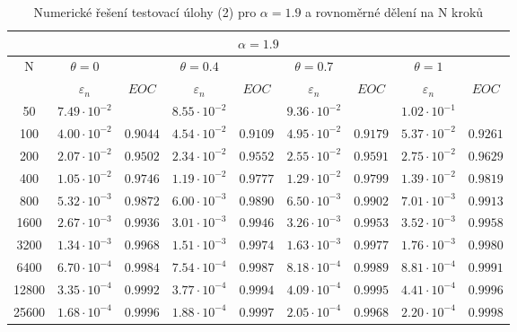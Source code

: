 \documentclass[a4paper,12pt,twoside]{article}
\theoremstyle{definition}
\theoremstyle{remark}
\numberwithin{equation}{section}
\numberwithin{table}{section}
\numberwithin{figure}{section}
\begin{document}
	\begin{table}[h!]
		\centering
		\caption{Numerické řešení testovací úlohy (2) pro $\alpha = 1.9$ a rovnoměrné dělení na N kroků}
		\label{tab:tabulkaTestovacíÚloha(2),alpha=1.9}
	\begin{tabular}{|c||cc|cc|cc|cc|}
		\hline
		\multicolumn{9}{|c|}{$\alpha = 1.9$} \\
		\hline
		N 	  & $\theta = 0$ & & $\theta = 0.4$ && $\theta = 0.7$ & &$\theta = 1$& \\
		\hline
		& $\varepsilon_{n}$    & $EOC$    & $\varepsilon_{n}$    &$EOC$   & $\varepsilon_{n}$    &$EOC$    &$\varepsilon_{n}$    &$EOC$ \\
		50 	  & $7.49 \cdot 10^{-2}$ & 		    & $8.55 \cdot 10^{-2}$ &		& $9.36 \cdot 10^{-2}$ & 	     &$1.02 \cdot 10^{-1}$& \\
		\hline
		100   & $4.00 \cdot 10^{-2}$ & $0.9044$ & $4.54 \cdot 10^{-2}$ &$0.9109$& $4.95 \cdot 10^{-2}$ &$0.9179$ &$5.37 \cdot 10^{-2}$&$0.9261$ \\
		\hline
		200   & $2.07 \cdot 10^{-2}$ & $0.9502$ & $2.34 \cdot 10^{-2}$ &$0.9552$& $2.55 \cdot 10^{-2}$ &$0.9591$ &$2.75 \cdot 10^{-2}$&$0.9629$\\
		\hline
		400   & $1.05 \cdot 10^{-2}$ & $0.9746$ & $1.19 \cdot 10^{-2}$ &$0.9777$& $1.29 \cdot 10^{-2}$ &$0.9799$ &$1.39 \cdot 10^{-2}$&$0.9819$ \\
		\hline
		800   & $5.32 \cdot 10^{-3}$ & $0.9872$ & $6.00 \cdot 10^{-3}$ &$0.9890$& $6.50 \cdot 10^{-3}$ &$0.9902$ &$7.01 \cdot 10^{-3}$&$0.9913$ \\
		\hline
		1600  & $2.67 \cdot 10^{-3}$ & $0.9936$ & $3.01 \cdot 10^{-3}$ &$0.9946$& $3.26 \cdot 10^{-3}$ &$0.9953$ &$3.52 \cdot 10^{-3}$&$0.9958$ \\
		\hline
		3200  & $1.34 \cdot 10^{-3}$ & $0.9968$ & $1.51 \cdot 10^{-3}$ &$0.9974$& $1.63 \cdot 10^{-3}$ &$0.9977$ &$1.76 \cdot 10^{-3}$&$0.9980$ \\
		\hline
		6400  & $6.70 \cdot 10^{-4}$ & $0.9984$ & $7.54 \cdot 10^{-4}$ &$0.9987$& $8.18 \cdot 10^{-4}$ &$0.9989$ &$8.81 \cdot 10^{-4}$&$0.9991$ \\
		\hline
		12800 & $3.35 \cdot 10^{-4}$ & $0.9992$ & $3.77 \cdot 10^{-4}$ &$0.9994$& $4.09 \cdot 10^{-4}$ &$0.9995$ &$4.41 \cdot 10^{-4}$&$0.9996$ \\
		\hline
		25600 & $1.68 \cdot 10^{-4}$ & $0.9996$ & $1.88 \cdot 10^{-4}$ &$0.9997$& $2.05 \cdot 10^{-4}$ &$0.9968$ &$2.20 \cdot 10^{-4}$&$0.9998$ \\
		\hline
	\end{tabular}
\end{table}
\end{document}
